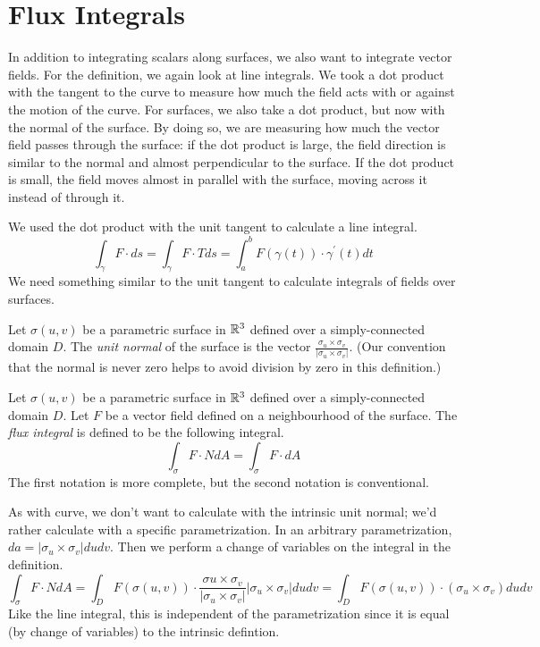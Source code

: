 \documentclass[fleqn,letterpaper]{report}
\begin{document}
\section{Flux Integrals}
\label{flux-integrals}

In addition to integrating scalars along surfaces, we also
want to integrate vector fields. For the definition, we again
look at line integrals. We took a dot product with the
tangent to the curve to measure how much the field acts with or
against the motion of the curve. For surfaces, we also take a
dot product, but now with the normal of the surface. 
By doing so, we are measuring how much the vector field passes through the
surface: if the dot product is large, the field direction is
similar to the normal and almost perpendicular to the surface.
If the dot product is small, the field moves almost in parallel
with the surface, moving across it instead of through it.

We used the dot product with the unit tangent to calculate a
line integral.
\begin{equation*}
\int_{\gamma} F \cdot ds = \int_{\gamma} F \cdot T ds =
\int_a^b F(\gamma(t)) \cdot \gamma^\prime(t) dt 
\end{equation*}
We need something similar to the unit tangent to calculate
integrals of fields over surfaces.

\begin{defn}
Let $\sigma(u,v)$ be a parametric surface in $\mathbb{R}^3$ defined
over a simply-connected domain $D$. The \emph{unit normal} of
the surface is the vector $\frac{\sigma_u \times
\sigma_v}{|\sigma_u \times \sigma_v|}$. (Our convention that
the normal is never zero helps to avoid division by zero in
this definition.)
\end{defn}

\begin{defn}
Let $\sigma(u,v)$ be a parametric surface in $\mathbb{R}^3$ defined
over a simply-connected domain $D$. Let $F$ be a vector field
defined on a neighbourhood of the surface. 
The \emph{flux integral} is defined to be the following
integral.
\begin{equation*}
\int_{\sigma} F \cdot N dA = 
\int_{\sigma} F \cdot dA 
\end{equation*}
The first notation is more complete, but the second notation
is conventional.
\end{defn}

As with curve, we don't want to calculate with the intrinsic
unit normal; we'd rather calculate with a specific
parametrization. In an arbitrary parametrization, $da = 
|\sigma_u \times \sigma_v| du dv$. Then we perform a change of
variables on the integral in the definition.
\begin{equation*}
\int_{\sigma} F \cdot N dA = \int_D
F(\sigma(u,v)) \cdot \frac{\sigma u \times \sigma_v}{|\sigma_u
\times \sigma_v|} |\sigma_u \times \sigma_v| du dv = \int_D
F(\sigma(u,v)) \cdot (\sigma_u \times \sigma_v) du dv
\end{equation*}
Like the line integral, this is independent of the
parametrization since it is equal (by change of variables) to
the intrinsic defintion.
\end{document}
